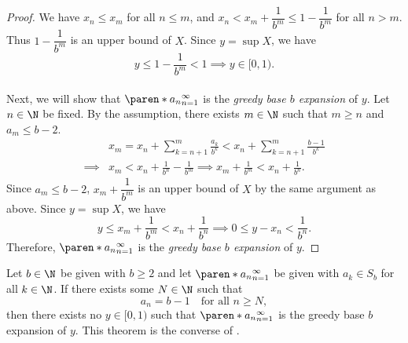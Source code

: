 \begin{proof}
    We have $x_{n} \leq x_{m}$ for all $n \leq m$, and $x_{n} < x_{m} + \dfrac{1}{b^{m}} \leq 1 - \dfrac{1}{b^{m}}$
    for all $n > m$. Thus $1 - \dfrac{1}{b^{m}}$ is an upper bound of $X$. Since $y = \sup X$, we have
    \[
    y \leq 1 - \frac{1}{b^{m}} < 1 \implies y \in [0, 1).
    \]
    \\[6mm]
    Next, we will show that $\paren*{a_{n}}_{n = 1}^{\infty}$ is the \emph{greedy base $b$ expansion} of $y$.
    Let $n \in \N$ be fixed. By the assumption, there exists $m \in \N$ such that $m \geq n$ and $a_{m} \leq b - 2$.
    \begin{align*}
        &x_{m} = x_{n} + \sum_{k = n + 1}^{m} \frac{a_{k}}{b^{k}} < x_{n} + \sum_{k = n + 1}^{m} \frac{b - 1}{b^{k}} \\
        \implies &x_{m} < x_{n} + \frac{1}{b^{n}} - \frac{1}{b^{m}}
        \implies x_{m} + \frac{1}{b^{m}} < x_{n} + \frac{1}{b^{n}}.
    \end{align*}
    Since $a_{m} \leq b - 2$, $x_{m} + \dfrac{1}{b^{m}}$ is an upper bound of $X$ by the same argument as above.
    Since $y = \sup X$, we have
    \[
    y \leq x_{m} + \frac{1}{b^{m}} < x_{n} + \frac{1}{b^{n}} \implies 0 \leq y - x_{n} < \frac{1}{b^{n}}.
    \]
    Therefore, $\paren*{a_{n}}_{n = 1}^{\infty}$ is the \emph{greedy base $b$ expansion} of $y$.
\end{proof}

\bigskip

\begin{theorem} \label{thm:NoRealNumberMatchingGreedyBaseExpansionConverse}
    Let $b \in \N$ be given with $b \geq 2$ and let $\paren*{a_{n}}_{n = 1}^{\infty}$ be given with $a_{k} \in S_{b}$
    for all $k \in \N$. If there exists some $N \in \N$ such that
    \[
    a_{n} = b - 1 \quad \text{for all } n \geq N,
    \]
    then there exists no $y \in [0, 1)$ such that $\paren*{a_{n}}_{n = 1}^{\infty}$ is the greedy base $b$ expansion of $y$.
    This theorem is the converse of .
\end{theorem}

